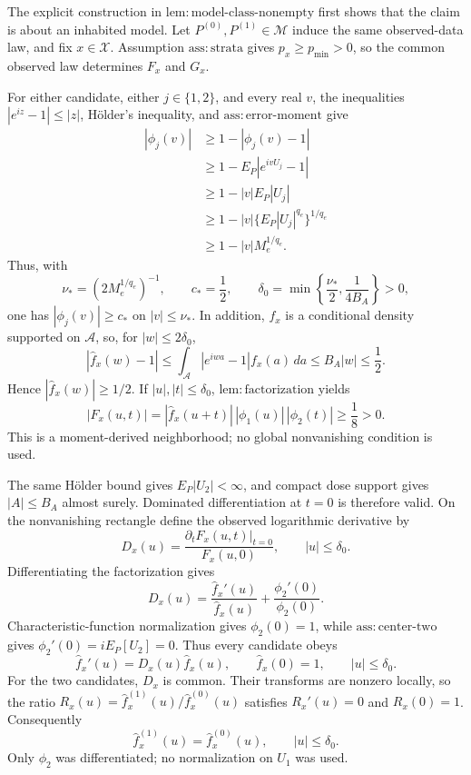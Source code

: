 The explicit construction in \(\mathrm{lem{:}model\text{-}class\text{-}nonempty}\) first shows that the claim is about an inhabited model.  Let \(P^{(0)},P^{(1)}\in\mathcal M\) induce the same observed-data law, and fix \(x\in\mathcal X\).  Assumption \(\mathrm{ass{:}strata}\) gives \(p_x\ge p_{\min}>0\), so the common observed law determines \(F_x\) and \(G_x\).

For either candidate, either \(j\in\{1,2\}\), and every real \(v\), the inequalities \(|e^{iz}-1|\le|z|\), H\"older's inequality, and \(\mathrm{ass{:}error\text{-}moment}\) give
\[
 \begin{aligned}
 |\phi_j(v)|
 &\ge1-|\phi_j(v)-1|\\
 &\ge1-E_P|e^{ivU_j}-1|\\
 &\ge1-|v|E_P|U_j|\\
 &\ge1-|v|\{E_P|U_j|^{q_e}\}^{1/q_e}\\
 &\ge1-|v|M_e^{1/q_e}.
 \end{aligned}
\]
Thus, with
\[
 \nu_*=(2M_e^{1/q_e})^{-1},
 \qquad c_*=\frac12,
 \qquad
 \delta_0=\min\left\{\frac{\nu_*}{2},\frac{1}{4B_A}\right\}>0,
\]
one has \(|\phi_j(v)|\ge c_*\) on \(|v|\le\nu_*\).  In addition, \(f_x\) is a conditional density supported on \(\mathcal A\), so, for \(|w|\le2\delta_0\),
\[
 |\widehat f_x(w)-1|
 \le\int_{\mathcal A}|e^{iwa}-1|f_x(a)\,da
 \le B_A|w|\le\frac12.
\]
Hence \(|\widehat f_x(w)|\ge1/2\).  If \(|u|,|t|\le\delta_0\), \(\mathrm{lem{:}factorization}\) yields
\[
 |F_x(u,t)|
 =|\widehat f_x(u+t)|\,|\phi_1(u)|\,|\phi_2(t)|
 \ge\frac18>0.
\]
This is a moment-derived neighborhood; no global nonvanishing condition is used.

The same H\"older bound gives \(E_P|U_2|<\infty\), and compact dose support gives \(|A|\le B_A\) almost surely.  Dominated differentiation at \(t=0\) is therefore valid.  On the nonvanishing rectangle define the observed logarithmic derivative by
\[
 D_x(u)=
 \frac{\left.\partial_tF_x(u,t)\right|_{t=0}}{F_x(u,0)},
 \qquad |u|\le\delta_0.
\]
Differentiating the factorization gives
\[
 D_x(u)=\frac{\widehat f_x'(u)}{\widehat f_x(u)}
       +\frac{\phi_2'(0)}{\phi_2(0)}.
\]
Characteristic-function normalization gives \(\phi_2(0)=1\), while \(\mathrm{ass{:}center\text{-}two}\) gives \(\phi_2'(0)=iE_P[U_2]=0\).  Thus every candidate obeys
\[
 \widehat f_x'(u)=D_x(u)\widehat f_x(u),
 \qquad \widehat f_x(0)=1,
 \qquad |u|\le\delta_0.
\]
For the two candidates, \(D_x\) is common.  Their transforms are nonzero locally, so the ratio \(R_x(u)=\widehat f_x^{(1)}(u)/\widehat f_x^{(0)}(u)\) satisfies \(R_x'(u)=0\) and \(R_x(0)=1\).  Consequently
\[
 \widehat f_x^{(1)}(u)=\widehat f_x^{(0)}(u),
 \qquad |u|\le\delta_0.
\]
Only \(\phi_2\) was differentiated; no normalization on \(U_1\) was used.

